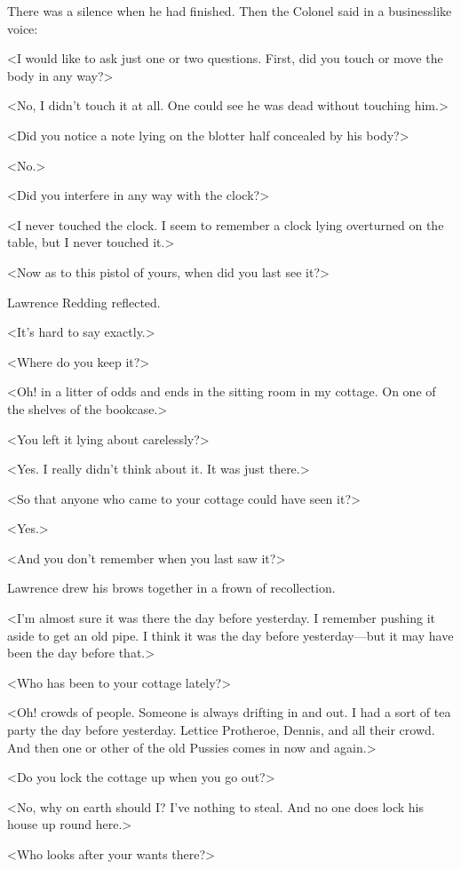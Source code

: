 There was a silence when he had finished. Then the Colonel said in a businesslike voice:

<I would like to ask just one or two questions. First, did you touch or move the body in any way?>

<No, I didn't touch it at all. One could see he was dead without touching him.>

<Did you notice a note lying on the blotter half concealed by his body?>

<No.>

<Did you interfere in any way with the clock?>

<I never touched the clock. I seem to remember a clock lying overturned on the table, but I never touched it.>

<Now as to this pistol of yours, when did you last see it?>

Lawrence Redding reflected.

<It's hard to say exactly.>

<Where do you keep it?>

<Oh! in a litter of odds and ends in the sitting room in my cottage. On one of the shelves of the bookcase.>

<You left it lying about carelessly?>

<Yes. I really didn't think about it. It was just there.>

<So that anyone who came to your cottage could have seen it?>

<Yes.>

<And you don't remember when you last saw it?>

Lawrence drew his brows together in a frown of recollection.

<I'm almost sure it was there the day before yesterday. I remember pushing it aside to get an old pipe. I think it was the day before yesterday—but it may have been the day before that.>

<Who has been to your cottage lately?>

<Oh! crowds of people. Someone is always drifting in and out. I had a sort of tea party the day before yesterday. Lettice Protheroe, Dennis, and all their crowd. And then one or other of the old Pussies comes in now and again.>

<Do you lock the cottage up when you go out?>

<No, why on earth should I? I've nothing to steal. And no one does lock his house up round here.>

<Who looks after your wants there?>

